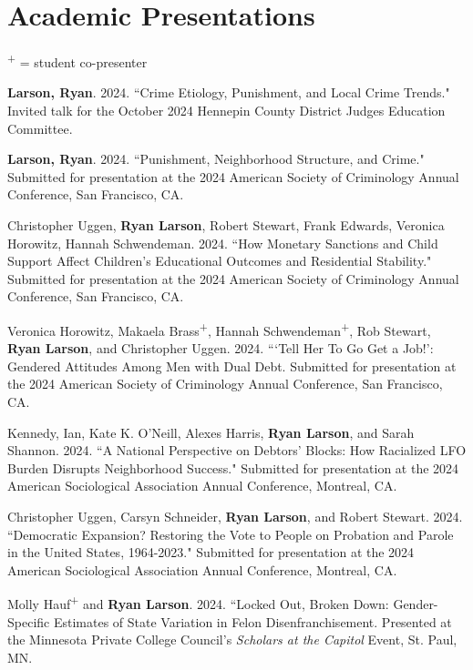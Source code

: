 \documentclass[letterpaper]{article}
\renewenvironment{itemize}{
  \begin{list}{}{
    \setlength{\leftmargin}{1.5em}
  }
}{
  \end{list}
}
\begin{document}
\section*{\textbf{Academic Presentations}} \textsuperscript{+} = student co-presenter
\begin{itemize}

\item \textbf{Larson, Ryan}. 2024. ``Crime Etiology, Punishment, and Local Crime Trends." Invited talk for the October 2024 Hennepin County District Judges Education Committee.  

\item \textbf{Larson, Ryan}. 2024. ``Punishment, Neighborhood Structure, and Crime." Submitted for presentation at the 2024 American Society of Criminology Annual Conference, San Francisco, CA. 

\item Christopher Uggen, \textbf{Ryan Larson}, Robert Stewart, Frank Edwards, Veronica Horowitz, Hannah Schwendeman. 2024. ``How Monetary Sanctions and Child Support Affect Children's Educational Outcomes and Residential Stability." Submitted for presentation at the 2024 American Society of Criminology Annual Conference, San Francisco, CA. 

\item Veronica Horowitz, Makaela Brass\textsuperscript{+}, Hannah Schwendeman\textsuperscript{+}, Rob Stewart, \textbf{Ryan Larson}, and Christopher Uggen. 2024. ```Tell Her To Go Get a Job!': Gendered Attitudes Among Men with Dual Debt. Submitted for presentation at the 2024 American Society of Criminology Annual Conference, San Francisco, CA. 

\item Kennedy, Ian, Kate K. O’Neill, Alexes Harris, \textbf{Ryan Larson}, and Sarah Shannon. 2024. ``A National Perspective on Debtors’ Blocks: How Racialized LFO Burden Disrupts Neighborhood Success." Submitted for presentation at the 2024 American Sociological Association Annual Conference, Montreal, CA. 

\item Christopher Uggen, Carsyn Schneider, \textbf{Ryan Larson}, and Robert Stewart. 2024. ``Democratic Expansion? Restoring the Vote to People on Probation and Parole in the United States, 1964-2023." Submitted for presentation at the 2024 American Sociological Association Annual Conference, Montreal, CA. 

\item Molly Hauf\textsuperscript{+} and \textbf{Ryan Larson}. 2024. ``Locked Out, Broken Down: Gender-Specific Estimates of State Variation in Felon Disenfranchisement. Presented at the Minnesota Private College Council's \textit{Scholars at the Capitol} Event, St. Paul, MN. 


\end{itemize}
\end{document}

